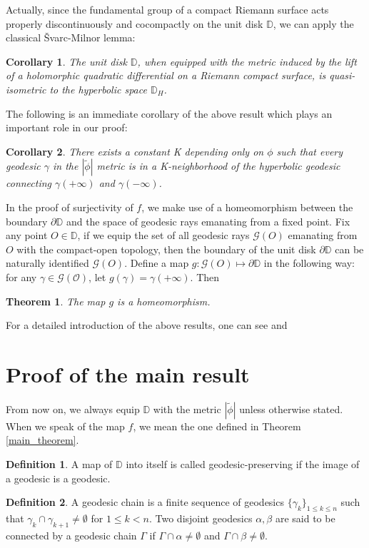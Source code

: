 \documentclass{amsart}
\theoremstyle{plain}
\newtheorem{Theorem}{Theorem}
\newtheorem{Corollary}{Corollary}[section]
\newtheorem*{MainTheorem*}{Theorem \ref{main_theorem}}
\theoremstyle{definition}
\newtheorem{Definition}{Definition}[section]
\theoremstyle{remark}
\begin{document}
Actually, since the fundamental group of a compact Riemann surface acts properly discontinuously and cocompactly on the unit disk $\mathbb{D}$, we can apply the classical \v{S}varc-Milnor lemma:
\begin{Corollary}
    The unit disk $\mathbb{D}$, when equipped with the metric induced by the lift of a holomorphic quadratic differential on a Riemann compact surface, is quasi-isometric to the hyperbolic space $\mathbb{D}_H$.  
\end{Corollary}
% 
The following is an immediate corollary  of the above result which plays an important role in our proof:
\begin{Corollary}
    There exists a constant K depending only on $\phi$ such that every geodesic $\gamma$ in the $|\tilde{\phi}|$ metric is in a K-neighborhood of the hyperbolic geodesic connecting $\gamma(+\infty)$ and $\gamma(-\infty)$.  
\end{Corollary}
% 
In the proof of surjectivity of $f$, we make use of a homeomorphism between the boundary $\partial \mathbb{D}$ and the space of geodesic rays emanating from a fixed point.  Fix any point $O\in \mathbb{D}$, if we equip the set of all geodesic rays $\mathcal{G}(O)$ emanating from $O$ with the compact-open topology, then the boundary of the unit disk $\partial \mathbb{D}$ can be naturally identified $\mathcal{G}(O)$.  Define a map $g : \mathcal{G}(O) \mapsto \partial \mathbb{D}$ in the following way: for any $\gamma \in \mathcal{G(O)}$, let $g(\gamma)=\gamma(+\infty)$.  Then
\begin{Theorem}
    The map $g$ is a homeomorphism.  
\end{Theorem}
For a detailed introduction of the above results, one can see \cite[Chapter D.3]{bridsonhaefliger2013metric} and \cite[Chapter 10]{Papadopoulos2014Metric}
% 
\section{Proof of the main result}
% 
% 
\noindent From now on, we always equip $\mathbb{D}$ with the metric $|\tilde{\phi}|$ unless otherwise stated.  When we speak of the map $f$, we mean the one defined in Theorem \ref{main_theorem}.
% 
\begin{Definition}
    A map of $\mathbb{D}$ into itself is called geodesic-preserving if the image of a geodesic is a geodesic.  
\end{Definition}
\begin{Definition}
    A geodesic chain is a finite sequence of geodesics $\{\gamma_k\}_{1\le k\le n}$ such that $\gamma_k\cap \gamma_{k+1} \ne \emptyset$ for $1 \le k<n$.  Two disjoint geodesics $\alpha, \beta$ are said to be connected by a geodesic chain $\Gamma$ if $\Gamma \cap \alpha \ne \emptyset$ and $\Gamma \cap \beta \ne \emptyset$.  
\end{Definition}
% 
% 
\end{document}
